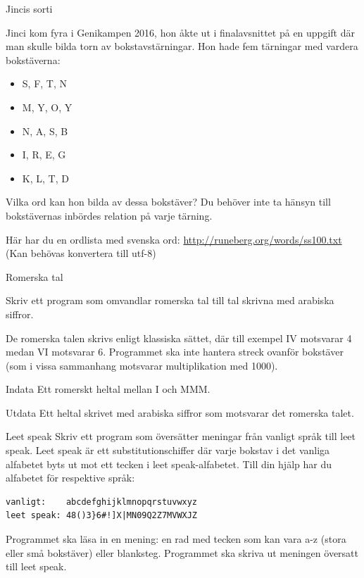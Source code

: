\documentclass[10pt]{beamer}
\begin{document}
\begin{frame}{Jincis sorti}

Jinci kom fyra i Genikampen 2016, hon åkte ut i finalavsnittet på en uppgift där man skulle bilda torn av bokstavstärningar. Hon hade fem tärningar med vardera bokstäverna: 

\begin{itemize}
\item S, F, T, N
\item M, Y, O, Y
\item N, A, S, B
\item I, R, E, G
\item K, L, T, D
\end{itemize}

Vilka ord kan hon bilda av dessa bokstäver? Du behöver inte ta hänsyn till bokstävernas inbördes relation på varje tärning. 

Här har du en ordlista med svenska ord: \url{http://runeberg.org/words/ss100.txt}
(Kan behövas konvertera till utf-8)

\end{frame}

\begin{frame}{Romerska tal}

Skriv ett program som omvandlar romerska tal till tal skrivna med arabiska siffror.

De romerska talen skrivs enligt klassiska sättet, där till exempel IV motsvarar 4 medan VI motsvarar 6. Programmet ska inte hantera streck ovanför bokstäver (som i vissa sammanhang motsvarar multiplikation med 1000). 

\begin{exampleblock}{Indata}
Ett romerskt heltal mellan I och MMM.
\end{exampleblock}

\begin{exampleblock}{Utdata}
Ett heltal skrivet med arabiska siffror som motsvarar det romerska talet.
\end{exampleblock}

\end{frame}




\begin{frame}[fragile]{Leet speak}
Skriv ett program som översätter meningar från vanligt språk till leet speak. Leet speak är ett substitutionschiffer där varje bokstav i det vanliga alfabetet byts ut mot ett tecken i leet speak-alfabetet. Till din hjälp har du alfabetet för respektive språk:
\begin{verbatim}
vanligt:    abcdefghijklmnopqrstuvwxyz
leet speak: 48()3}6#!]X|MN09Q2Z7MVWXJZ
\end{verbatim}
Programmet ska läsa in en mening: en rad med tecken som kan vara a-z (stora eller små bokstäver) eller blanksteg. Programmet ska skriva ut meningen översatt till leet speak. 
\end{frame}
\end{document}
